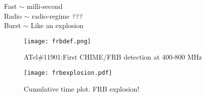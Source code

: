 
\begin{frame}
\begin{center}
\vspace*{\vfill}
{\Large F}ast \hfill $\sim$ milli-second\\
{\Large R}adio \hfill $\sim$ radio-regime \emph{???}\\
{\Large B}urst \hfill $\sim$ Like an explosion\\
\begin{figure}
\texttt{[image: frbdef.png]}
\caption{ATel\#11901:First CHIME/FRB detection at 400-800 MHz}
\end{figure}
\vspace*{\vfill}
\end{center}
\end{frame}


\begin{frame}
\begin{figure}
\centering
\texttt{[image: frbexplosion.pdf]}
\label{fig:frbx}
\caption{Cumulative time plot. FRB explosion!}
\end{figure}
\end{frame}

